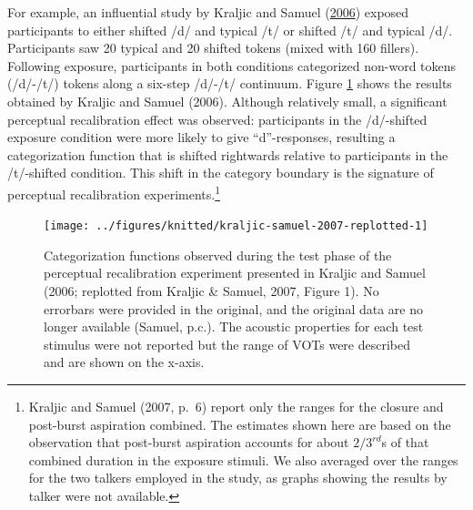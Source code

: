\documentclass[
  11pt,
  man,floatsintext]{apa6}
\begin{document}
For example, an influential study by Kraljic and Samuel (\protect\hyperlink{ref-kraljic-samuel2006}{2006}) exposed participants to either shifted /d/ and typical /t/ or shifted /t/ and typical /d/. Participants saw 20 typical and 20 shifted tokens (mixed with 160 fillers). Following exposure, participants in both conditions categorized non-word tokens (/d/-/t/) tokens along a six-step /d/-/t/ continuum. Figure \ref{fig:kraljic-samuel-2007-replotted} shows the results obtained by Kraljic and Samuel (2006). Although relatively small, a significant perceptual recalibration effect was observed: participants in the /d/-shifted exposure condition were more likely to give ``d''-responses, resulting a categorization function that is shifted rightwards relative to participants in the /t/-shifted condition. This shift in the category boundary is the signature of perceptual recalibration experiments.\footnote{Kraljic and Samuel (2007, p.~6) report only the ranges for the closure and post-burst aspiration combined. The estimates shown here are based on the observation that post-burst aspiration accounts for about \(2/3^{rd}\)s of that combined duration in the exposure stimuli. We also averaged over the ranges for the two talkers employed in the study, as graphs showing the results by talker were not available.}



\begin{figure}

{\centering \texttt{[image: ../figures/knitted/kraljic-samuel-2007-replotted-1]} 

}

\caption{Categorization functions observed during the test phase of the perceptual recalibration experiment presented in Kraljic and Samuel (2006; replotted from Kraljic \& Samuel, 2007, Figure 1). No errorbars were provided in the original, and the original data are no longer available (Samuel, p.c.). The acoustic properties for each test stimulus were not reported but the range of VOTs were described and are shown on the x-axis.}\label{fig:kraljic-samuel-2007-replotted}
\end{figure}
\end{document}
